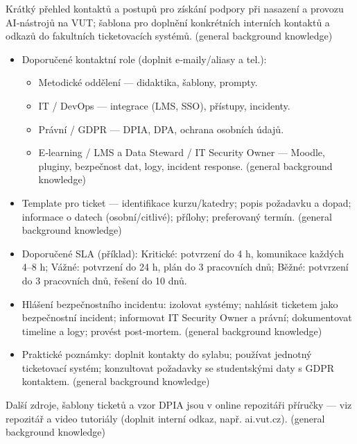 Krátký přehled kontaktů a postupů pro získání podpory při nasazení a provozu AI‑nástrojů na VUT; šablona pro doplnění konkrétních interních kontaktů a odkazů do fakultních ticketovacích systémů. (general background knowledge)
\begin{itemize}
\item Doporučené kontaktní role (doplnit e‑maily/aliasy a tel.): \begin{itemize}
  \item Metodické oddělení — didaktika, šablony, prompty.
  \item IT / DevOps — integrace (LMS, SSO), přístupy, incidenty.
  \item Právní / GDPR — DPIA, DPA, ochrana osobních údajů.
  \item E‑learning / LMS a Data Steward / IT Security Owner — Moodle, pluginy, bezpečnost dat, logy, incident response. (general background knowledge)
\end{itemize}
\item Template pro ticket — identifikace kurzu/katedry; popis požadavku a dopad; informace o datech (osobní/citlivé); přílohy; preferovaný termín. (general background knowledge)
\item Doporučené SLA (příklad): Kritické: potvrzení do 4 h, komunikace každých 4–8 h; Vážné: potvrzení do 24 h, plán do 3 pracovních dnů; Běžné: potvrzení do 3 pracovních dnů, řešení do 10 dnů.
\item Hlášení bezpečnostního incidentu: izolovat systémy; nahlásit ticketem jako bezpečnostní incident; informovat IT Security Owner a právní; dokumentovat timeline a logy; provést post‑mortem. (general background knowledge)
\item Praktické poznámky: doplnit kontakty do sylabu; používat jednotný ticketovací systém; konzultovat požadavky se studentskými daty s GDPR kontaktem. (general background knowledge)
\end{itemize}
Další zdroje, šablony ticketů a vzor DPIA jsou v online repozitáři příručky — viz repozitář a video tutoriály (doplnit interní odkaz, např. ai.vut.cz). (general background knowledge)